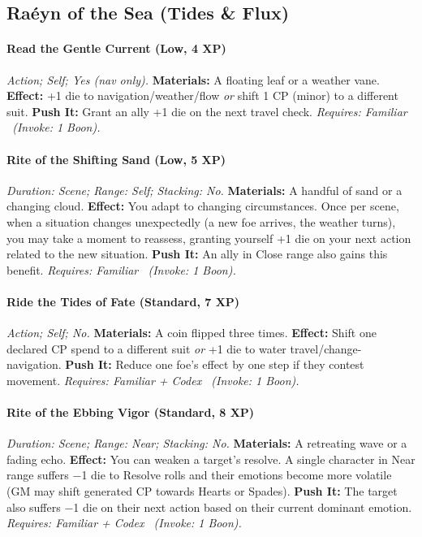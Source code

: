 \documentclass[12pt,twoside]{book}
\begin{document}
\subsection{Raéyn of the Sea (Tides \& Flux)}
\paragraph{Read the Gentle Current (Low, 4 XP)} \emph{Action; Self; Yes (nav only).}
\textbf{Materials:} A floating leaf or a weather vane.
\textbf{Effect:} +1 die to navigation/weather/flow \emph{or} shift 1 CP (minor) to a different suit.
\textbf{Push It:} Grant an ally +1 die on the next travel check.
\emph{Requires: Familiar \ (\textit{Invoke:} 1 Boon).}
\paragraph{Rite of the Shifting Sand (Low, 5 XP)} \emph{Duration: Scene; Range: Self; Stacking: No.}
\textbf{Materials:} A handful of sand or a changing cloud.
\textbf{Effect:} You adapt to changing circumstances. Once per scene, when a situation changes unexpectedly (a new foe arrives, the weather turns), you may take a moment to reassess, granting yourself +1 die on your next action related to the new situation.
\textbf{Push It:} An ally in Close range also gains this benefit.
\emph{Requires: Familiar \ (\textit{Invoke:} 1 Boon).}
\paragraph{Ride the Tides of Fate (Standard, 7 XP)} \emph{Action; Self; No.}
\textbf{Materials:} A coin flipped three times.
\textbf{Effect:} Shift one declared CP spend to a different suit \emph{or} +1 die to water travel/change-navigation.
\textbf{Push It:} Reduce one foe’s effect by one step if they contest movement.
\emph{Requires: Familiar + Codex \ (\textit{Invoke:} 1 Boon).}
\paragraph{Rite of the Ebbing Vigor (Standard, 8 XP)} \emph{Duration: Scene; Range: Near; Stacking: No.}
\textbf{Materials:} A retreating wave or a fading echo.
\textbf{Effect:} You can weaken a target's resolve. A single character in Near range suffers −1 die to Resolve rolls and their emotions become more volatile (GM may shift generated CP towards Hearts or Spades).
\textbf{Push It:} The target also suffers −1 die on their next action based on their current dominant emotion.
\emph{Requires: Familiar + Codex \ (\textit{Invoke:} 1 Boon).}
\end{document}
